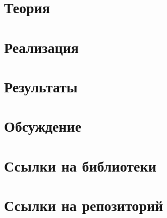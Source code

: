 \documentclass[14pt,a4paper,article]{ncc}
\begin{document}
\section{Теория}
\label{sec:theory}
\newpage

\section{Реализация}
\label{sec:impl}
\newpage

\section{Результаты}
\label{sec:result}





\newpage

\section{Обсуждение}
\label{sec:discuss}





\newpage

\section{Ссылки на библиотеки}
\label{sec:liter}
\newpage

\section{Ссылки на репозиторий}
\label{sec:rep}
\end{document}
